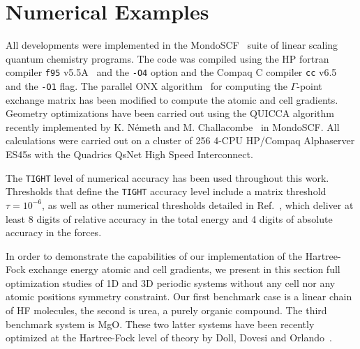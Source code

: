 \documentclass[prl,preprint,doublespace]{revtex4} %
\begin{document}
\section{Numerical Examples}\label{Sec:NumExamples}
All developments were implemented in the {\sc MondoSCF}~\cite{MondoSCF} suite of
linear scaling quantum chemistry programs. 
The code was compiled using the HP fortran compiler {\tt f95}
v5.5A~\cite{f95-v5.5a} and the {\tt -O4} option and the Compaq
C compiler {\tt cc} v6.5~\cite{cc-v6.5} and the {\tt -O1} flag.
The parallel ONX algorithm~\cite{VWeber05a} for computing
the $\Gamma$-point exchange matrix has been modified to compute
the atomic and cell gradients.
Geometry optimizations have been carried out using the QUICCA algorithm recently
implemented by K. N\'emeth and M. Challacombe~\cite{KNemeth04,KNemeth05} in {\sc MondoSCF}. 
All calculations were carried out on a cluster of 256 4-CPU HP/Compaq
Alphaserver ES45s with the Quadrics QsNet High Speed Interconnect.



The {\tt TIGHT} level of numerical accuracy has been used throughout this work.  
Thresholds that define the {\tt TIGHT} accuracy level include a matrix 
threshold $\tau=10^{-6}$, as well as other numerical thresholds 
detailed in Ref.~\cite{CTymczak04a}, which deliver at least 8 digits of 
relative accuracy in the total energy and 4 digits of absolute accuracy 
in the forces.  

In order to demonstrate the capabilities of our implementation of the
Hartree-Fock exchange energy atomic and cell gradients, we present in this section 
full optimization studies of 1D and 3D periodic systems without any cell 
nor any atomic positions symmetry constraint. 
Our first benchmark case is a linear chain of HF molecules, the second is
urea, a purely organic compound. The third benchmark system is MgO. 
These two latter systems have been recently optimized at the Hartree-Fock 
level of theory by Doll, Dovesi and Orlando~\cite{KDoll04}.
\end{document}
